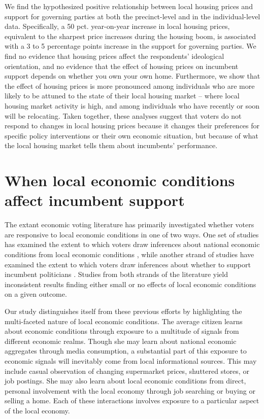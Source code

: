 \documentclass[12pt,a4paper]{article}
\begin{document}
	We find the hypothesized positive relationship between local housing prices and support for governing parties at both the precinct-level and in the individual-level data. Specifically, a 50 pct. year-on-year increase in local housing prices, equivalent to the sharpest price increases during the housing boom, is associated with a 3 to 5 percentage points increase in the support for governing parties. We find no evidence that housing prices affect the respondents’ ideological orientation, and no evidence that the effect of housing prices on incumbent support depends on whether you own your own home. Furthermore, we show that the effect of housing prices is more pronounced among individuals who are more likely to be attuned to the state of their local housing market -- where local housing market activity is high, and among individuals who have recently or soon will be relocating. Taken together, these analyses suggest that voters do not respond to changes in local housing prices because it changes their preferences for specific policy interventions or their own economic situation, but because of what the local housing market tells them about incumbents' performance.
	
	\section{When local economic conditions affect incumbent support}
	
	The extant economic voting literature has primarily investigated whether voters are responsive to local economic conditions in one of two ways. One set of studies has examined the extent to which voters draw inferences about national economic conditions from local economic conditions \citep{books1999contextual,reeves2012ecologies,anderson2011local,ansolabehere2014mecro}, while another strand of studies have examined the extent to which voters draw inferences about whether to support incumbent politicians  \citep{hansford2015reevaluating,eisenberg2004economic,kim2003spatial,healy2014presidential, hall2017economic,elinder2010local,auberger2005influence}. Studies from both strands of the literature yield inconsistent results finding either small or no effects of local economic conditions on a given outcome.   
	
	Our study distinguishes itself from these previous efforts by highlighting the multi-faceted nature of local economic conditions. The average citizen learns about economic conditions through exposure to a multitude of signals from different economic realms. Though she may learn about national economic aggregates through media consumption, a substantial part of this exposure to economic signals will inevitably come from local informational sources. This may include casual observation of changing supermarket prices, shuttered stores, or job postings. She may also learn about local economic conditions from direct, personal involvement with the local economy through job searching or buying or selling a home. Each of these interactions involves exposure to a particular aspect of the local economy.
	
\end{document}
